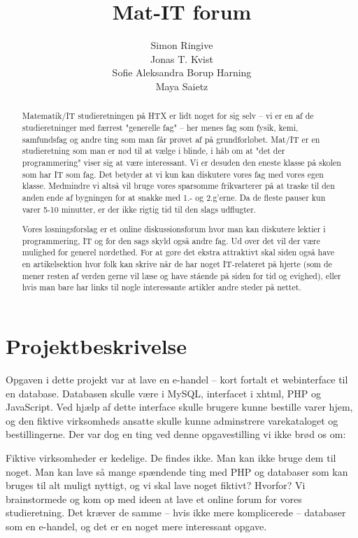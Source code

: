 \documentclass{article}
\title{Mat-IT forum}
\author{Simon Ringive\\Jonas T. Kvist\\Sofie Aleksandra Borup Harning\\Maya Saietz}
\begin{document}
\maketitle
\newpage

\begin{abstract}

Matematik/IT studieretningen på HTX er lidt noget for sig selv – vi er en af de studieretninger med færrest "generelle fag" – her menes fag som fysik, kemi, samfundsfag og andre ting som man får prøvet af på grundforløbet. Mat/IT er en studieretning som man er nød til at vælge i blinde, i håb om at "det der programmering" viser sig at være interessant. Vi er desuden den eneste klasse på skolen som har IT som fag. Det betyder at vi kun kan diskutere vores fag med vores egen klasse. Medmindre vi altså vil bruge vores sparsomme frikvarterer på at traske til den anden ende af bygningen for at snakke med 1.- og 2.g'erne. Da de fleste pauser kun varer 5-10 minutter, er der ikke rigtig tid til den slags udflugter.

Vores løsningsforslag er et online diskussionsforum hvor man kan diskutere lektier i programmering, IT og for den sags skyld også andre fag. Ud over det vil der være mulighed for generel nørdethed. For at gøre det ekstra attraktivt skal siden også have en artikelsektion hvor folk kan skrive når de har noget IT-relateret på hjerte (som de mener resten af verden gerne vil læse og have stående på siden for tid og evighed), eller hvis man bare har links til nogle interessante artikler andre steder på nettet. 

\end{abstract}
\newpage
\tableofcontents
\newpage

\section{Projektbeskrivelse}

Opgaven i dette projekt var at lave en e-handel – kort fortalt et webinterface til en database. Databasen skulle være i MySQL, interfacet i xhtml, PHP og JavaScript. Ved hjælp af dette interface skulle brugere kunne bestille varer hjem, og den fiktive virksomheds ansatte skulle kunne adminstrere varekataloget og bestillingerne. Der var dog en ting ved denne opgavestilling vi ikke brød os om:

Fiktive virksomheder er kedelige. De findes ikke. Man kan ikke bruge dem til noget. Man kan lave så mange spændende ting med PHP og databaser som kan bruges til alt muligt nyttigt, og vi skal lave noget fiktivt? Hvorfor?
Vi brainstormede og kom op med ideen at lave et online forum for vores studieretning. Det kræver de samme – hvis ikke mere komplicerede – databaser som en e-handel, og det er en noget mere interessant opgave.
\end{document}
